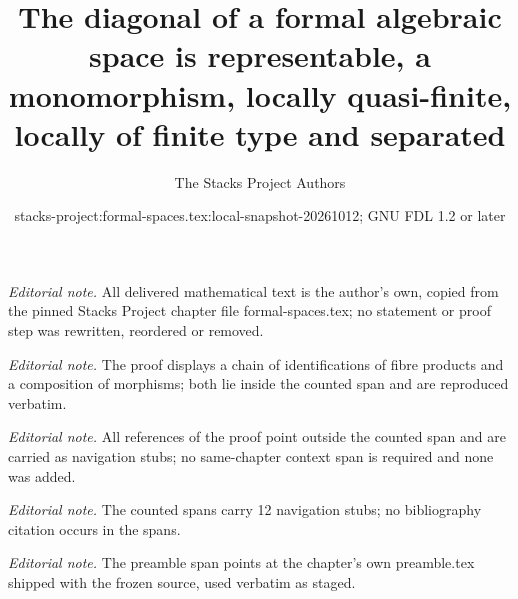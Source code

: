 \documentclass{stacks-project}
\title{The diagonal of a formal algebraic space is representable, a monomorphism, locally quasi-finite, locally of finite type and separated}
\author{The Stacks Project Authors}
\date{stacks-project:formal-spaces.tex:local-snapshot-20261012; GNU FDL 1.2 or later}
\theoremstyle{plain}
\theoremstyle{definition}
\theoremstyle{remark}
\numberwithin{equation}{subsection}
\begin{document}
\maketitle
\noindent\textit{Editorial note.} All delivered mathematical text is the author's own, copied from the pinned Stacks Project chapter file formal-spaces.tex; no statement or proof step was rewritten, reordered or removed.\par\medskip
\noindent\textit{Editorial note.} The proof displays a chain of identifications of fibre products and a composition of morphisms; both lie inside the counted span and are reproduced verbatim.\par\medskip
\noindent\textit{Editorial note.} All references of the proof point outside the counted span and are carried as navigation stubs; no same-chapter context span is required and none was added.\par\medskip
\noindent\textit{Editorial note.} The counted spans carry 12 navigation stubs; no bibliography citation occurs in the spans.\par\medskip
\noindent\textit{Editorial note.} The preamble span points at the chapter's own preamble.tex shipped with the frozen source, used verbatim as staged.\par\medskip
\end{document}

